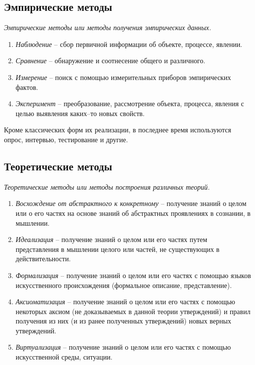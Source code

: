 \subsection{Эмпирические методы}
\emph{Эмпирические методы или методы получения эмпирических данных.}
\begin{enumerate}
\item \emph{Наблюдение} -- сбор первичной информации об объекте, процессе, явлении.
\item \emph{Сравнение} -- обнаружение и соотнесение общего и различного.
\item \emph{Измерение} -- поиск с помощью измерительных приборов эмпирических фактов.
\item \emph{Эксперимент} -- преобразование, рассмотрение объекта, процесса, явления с целью выявления каких--то новых свойств.
\end{enumerate}
Кроме классических форм их реализации, в последнее время используются опрос, интервью, тестирование и другие.
\subsection{Теоретические методы}
\emph{Теоретические методы или методы построения различных теорий.}
\begin{enumerate}
\item \emph{Восхождение от абстрактного к конкретному} -- получение знаний о целом или о его частях на основе знаний об абстрактных проявлениях в сознании, в мышлении.
\item \emph{Идеализация} -- получение знаний о целом или его частях путем представления в мышлении целого или частей, не существующих в действительности.
\item \emph{Формализация} -- получение знаний о целом или его частях с помощью языков искусственного происхождения (формальное описание, представление).
\item \emph{Аксиоматизация} -- получение знаний о целом или его частях с помощью некоторых аксиом (не доказываемых в данной теории утверждений) и правил получения из них (и из ранее полученных утверждений) новых верных утверждений.
\item \emph{Виртуализация} -- получение знаний о целом или его частях с помощью искусственной среды, ситуации.
\end{enumerate}

